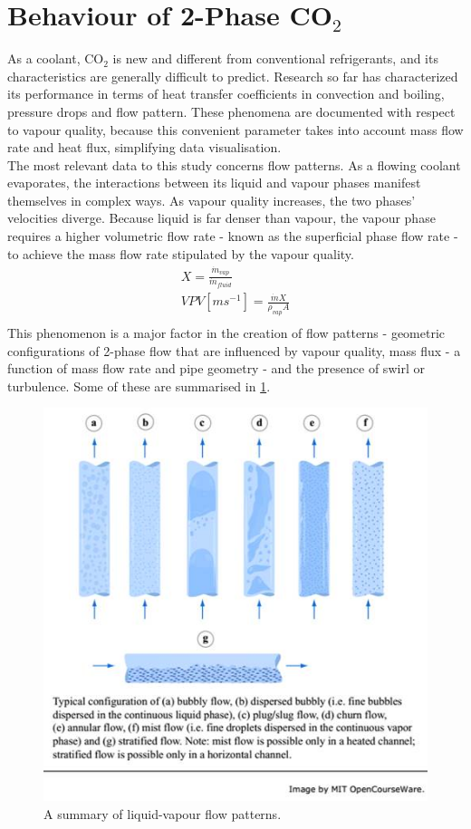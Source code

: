 \documentclass{report}
\begin{document}
\section{Behaviour of 2-Phase CO$_2$} \label{behaviour}
As a coolant, CO$_2$ is new and different from conventional refrigerants, and its characteristics are generally difficult to predict. Research so far has characterized its performance in terms of heat transfer coefficients in convection and boiling, pressure drops and flow pattern.\cite{Mastrullo 2010}\cite{Cheng 2008}\cite{Yun 2005}\cite{Wu 2011} These phenomena are documented with respect to vapour quality, because this convenient parameter takes into account mass flow rate and heat flux, simplifying data visualisation. \\
The most relevant data to this study concerns flow patterns. As a flowing coolant evaporates, the interactions between its liquid and vapour phases manifest themselves in complex ways. As vapour quality increases, the two phases' velocities diverge. Because liquid is far denser than vapour, the vapour phase requires a higher volumetric flow rate - known as the superficial phase flow rate - to achieve the mass flow rate stipulated by the vapour quality. \\
\begin{eqnarray}
X=\frac{\dot{m}_{vap}}{\dot{m}_{fluid}}\\
VPV[ms^{-1}]=\frac{\dot{m}X}{\rho_{vap}A}\\
\end{eqnarray}
This phenomenon is a major factor in the creation of flow patterns - geometric configurations of 2-phase flow that are influenced by vapour quality, mass flux - a function of mass flow rate and pipe geometry - and the presence of swirl or turbulence. Some of these are summarised in \ref{fig:flowPatterns}. 
\begin{figure}
\includegraphics[width=\textwidth]{flowPatterns}
\caption{A summary of liquid-vapour flow patterns. \cite{MIT}}
\label{fig:flowPatterns}
\end{figure}
\end{document}
